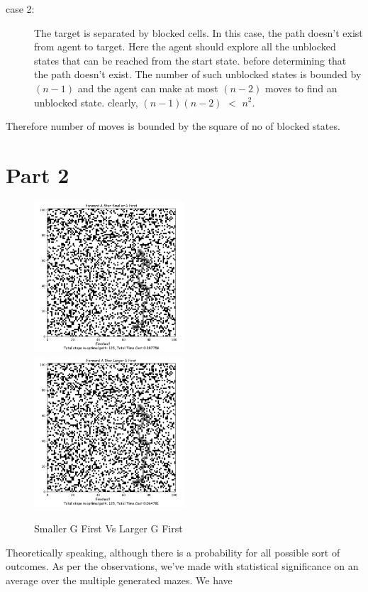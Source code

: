 \documentclass{article}
\begin{document}
\begin{enumerate}
\begin{description}
    \item[case 2:] The target is separated by blocked cells. In this case, the path doesn't exist from agent to target. Here the agent should explore all the unblocked states that can be reached from the start state. before determining that the path doesn't exist. The number of such unblocked states is bounded by $(n-1)$ and the agent can make at most $(n-2)$ moves to find an unblocked state. clearly, $(n-1)(n-2)$ $<$ $n^2$.
    \end{description}
    Therefore number of moves is bounded by the square of no of blocked states.
\end{enumerate}

\section*{Part 2}
\begin{figure}[h!]
\includegraphics[width=0.5\textwidth, inner]{fsmg1}
\includegraphics[width=0.5\textwidth, right]{flg1}
\caption{Smaller G First Vs Larger G First}
\label{fig:figure2}
\end{figure}
\noindent Theoretically speaking, although there is a probability for all possible sort of outcomes. As per the observations, we've made with statistical significance on an average over the multiple generated mazes. We have 
\end{document}

